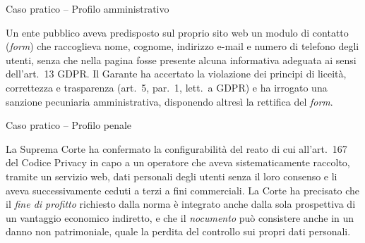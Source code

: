 \documentclass[aspectratio=169]{beamer}
\begin{document}
\begin{frame}{Caso pratico -- Profilo amministrativo}

  \begin{sentenzabox}
    \small
    Un ente pubblico aveva predisposto sul proprio sito web un modulo di
    contatto (\emph{form}) che raccoglieva nome, cognome, indirizzo e-mail
    e numero di telefono degli utenti, senza che nella pagina fosse presente
    alcuna informativa adeguata ai sensi dell'art.~13 GDPR. Il Garante ha
    accertato la violazione dei principi di liceità, correttezza e trasparenza
    (art.~5, par.~1, lett.~a GDPR) e ha irrogato una sanzione pecuniaria
    amministrativa, disponendo altresì la rettifica del \emph{form}.
  \end{sentenzabox}

\end{frame}

\begin{frame}{Caso pratico -- Profilo penale}

  \begin{sentenzabox}
    \small
    La Suprema Corte ha confermato la configurabilità del reato di cui all'art.~167
    del Codice Privacy in capo a un operatore che aveva sistematicamente raccolto,
    tramite un servizio web, dati personali degli utenti senza il loro consenso e li
    aveva successivamente ceduti a terzi a fini commerciali. La Corte ha precisato
    che il \emph{fine di profitto} richiesto dalla norma è integrato anche dalla sola
    prospettiva di un vantaggio economico indiretto, e che il \emph{nocumento}
    può consistere anche in un danno non patrimoniale, quale la perdita del controllo
    sui propri dati personali.
  \end{sentenzabox}

\end{frame}
\end{document}
